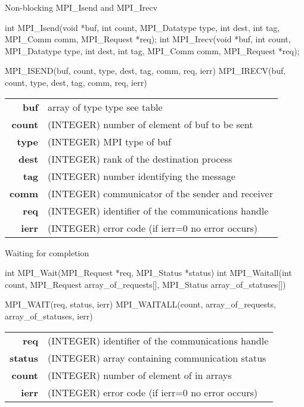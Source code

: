 \documentclass[aspectratio=43]{beamer}
\begin{document}
\begin{frame}[fragile]{Non-blocking MPI\_Isend and MPI\_Irecv}
\begin{Cpplisting}[]{}
int MPI_Isend(void *buf, int count, MPI_Datatype type, int dest, int tag, MPI_Comm comm, MPI_Request *req);
int MPI_Irecv(void *buf, int count, MPI_Datatype type, int dest, int tag, MPI_Comm comm, MPI_Request *req);
\end{Cpplisting}
\begin{Fortranlisting}[]{}
MPI_ISEND(buf, count, type, dest, tag, comm, req, ierr)
MPI_IRECV(buf, count, type, dest, tag, comm, req, ierr)
\end{Fortranlisting}
\begin{black1block}{}
\begin{tabular}{rl}
    \textbf{buf} & array of type type see table\\
    \textbf{count} & (INTEGER) number of element of buf to be sent\\
    \textbf{type} & (INTEGER) MPI type of buf\\
    \textbf{dest} & (INTEGER) rank of the destination process\\
    \textbf{tag} & (INTEGER) number identifying the message\\
    \textbf{comm} & (INTEGER) communicator of the sender and receiver\\
    \textbf{req} & (INTEGER) identifier of the communications handle\\
    \textbf{ierr} & (INTEGER) error code (if ierr=0 no error occurs)\\
\end{tabular}
\end{black1block}
\end{frame}

\begin{frame}[fragile]{Waiting for completion}
\begin{Cpplisting}[]{}
int MPI_Wait(MPI_Request *req, MPI_Status *status)
int MPI_Waitall(int count, MPI_Request array_of_requests[], MPI_Status array_of_statuses[])
\end{Cpplisting}
\begin{Fortranlisting}[]{}
MPI_WAIT(req, status, ierr)
MPI_WAITALL(count, array_of_requests, array_of_statuses, ierr)
\end{Fortranlisting}
\begin{black1block}{}
\begin{tabular}{rl}
    \textbf{req} & (INTEGER) identifier of the communications handle\\
    \textbf{status} & (INTEGER) array containing communication status\\
    \textbf{count} & (INTEGER) number of element of in arrays\\
    \textbf{ierr} & (INTEGER) error code (if ierr=0 no error occurs)\\
\end{tabular}
\end{black1block}
\end{frame}
\end{document}
